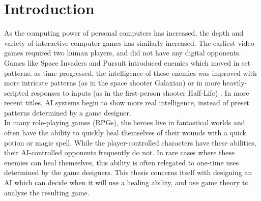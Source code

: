 \chapter{Introduction}
As the computing power of personal computers has increased, the depth and variety of interactive computer games has similarly increased. The earliest video games required two human players, and did not have any digital opponents. Games like Space Invaders and Pursuit introduced enemies which moved in set patterns; as time progressed, the intelligence of these enemies was improved with more intricate patterns (as in the space shooter Galaxian) or in more heavily-scripted responses to inputs (as in the first-person shooter Half-Life) \cite{schw04}. In more recent titles, AI systems begin to show more real intelligence, instead of preset patterns determined by a game designer.\\

In many role-playing games (RPGs), the heroes live in fantastical worlds and often have the ability to quickly heal themselves of their wounds with a quick potion or magic spell. While the player-controlled characters have these abilities, their AI-controlled opponents frequently do not. In rare cases where these enemies can heal themselves, this ability is often relegated to one-time uses determined by the game designers. This thesis concerns itself with designing an AI which can decide when it will use a healing ability, and use game theory to analyze the resulting game.